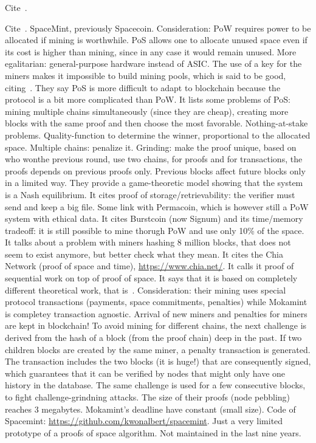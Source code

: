 Cite~\cite{RenD16}.

Cite~\cite{ParkKFGAP18}. SpaceMint, previously Spacecoin. Consideration: PoW requires power
to be allocated if mining is worthwhile. PoS allows one to allocate unused space even if its
cost is higher than mining, since in any case it would remain unused. More egalitarian:
general-purpose hardware instead of ASIC. The use of a key for the miners makes it
impossible to build mining pools, which is said to be good, citing~\cite{MillerKKS15}.
They say PoS is more difficult to adapt to blockchain because the protocol is a bit
more complicated than PoW. It lists some problems of PoS: mining multiple chains simultaneously
(since they are cheap), creating more blocks with the same proof and then choose the most
favorable. Nothing-at-stake problems. Quality-function to determine the winner, proportional
to the allocated space. Multiple chains: penalize it. Grinding: make the proof unique, based
on who wonthe previous round, use
two chains, for proofs and for transactions, the proofs depends on previous proofs only.
Previous blocks affect future blocks only in a limited way.
They provide a game-theoretic model showing that the system is
a Nash equilibrium.
It cites proof of storage/retrievability: the verifier must send and keep a big file.
Some link with Permacoin, which is however still a PoW system with ethical data.
It cites Burstcoin (now Signum) and its time/memory tradeoff: it is still possible
to mine thorugh PoW and use only 10\% of the space.
It talks about a problem with miners hashing 8 million blocks, that does not seem to exist
anymore, but better check what they mean.
It cites the Chia Network (proof of space and time), \url{https://www.chia.net/}.
It calls it proof of sequential work on top of proof of space.
It says that it is based on completely different theoretical work, that is~\cite{AbusalahACKPR17}.
Consideration: their mining uses special protocol transactions
(payments, space commitments, penalties) while Mokamint is completey transaction agnostic.
Arrival of new miners and penalties for miners are kept in blockchain!
To avoid mining for different chains, the next challenge is derived from the hash of a block
(from the proof chain) deep in the past. If two children blocks are created by the same miner,
a penalty transaction is generated. The transaction includes the two blocks (it is huge!)
that are consequently signed, which guarantees that it can be verified by nodes that might
only have one history in the database.
The same challenge is used for a few consecutive blocks, to fight challenge-grindning attacks.
The size of their proofs (node pebbling) reaches 3 megabytes. Mokamint's deadline have constant (small size).
Code of Spacemint: \url{https://github.com/kwonalbert/spacemint}. Just a very limited prototype of a
proofs of space algorithm. Not maintained in the last nine years.

